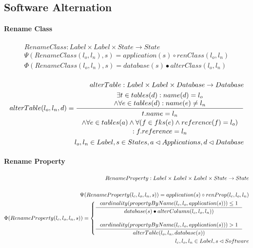 \documentclass[11pt]{article}
\begin{document}
\subsection{Software Alternation}
\paragraph{Rename Class}
\begin{align*}
RenameClass : Label \times Label \times State \rightarrow State \\ 
\Psi(RenameClass(l_o, l_n), s) = application(s) \circ renClass(l_o, l_n) \\
\Phi(RenameClass(l_o, l_n), s) = database(s) \bullet alterClass(l_o, l_n) \\ \\
\end{align*}
\begin{align*}
alterTable:  Label \times Label \times Database \rightarrow Database \\
alterTable(l_o, l_n, d) = \inference{\exists t \in tables(d) : name(d) = l_o \\ \wedge \forall e \in tables(d) : name(e) \neq l_n}{\begin{gathered}
t.name = l_n \\ \wedge \forall e \in tables(a) \wedge \forall (f \in fks(e) \wedge reference(f) = l_o ) \\ : f.reference = l_n 
\end{gathered}}\\
l_o, l_n \in Label, s \in States, a \lhd Applications, d \lhd Database
\end{align*}

\paragraph{Rename Property}
\begin{align*}
	RenameProperty : Label \times Label \times Label \times State \rightarrow State \\ \\
\Psi(RenameProperty(l_c, l_o, l_n, s)) = application(s) \circ renProp(l_c, l_o, l_n) \\
\Phi(RenameProperty(l_c, l_o, l_n, s)) = \begin{cases}
 	\inference{cardinality(propertyByName(l_c, l_o, application(s))) \leq 1}{database(s) \bullet alterColumn(l_c, l_o, l_n))} \\\\
 	\inference{cardinality(propertyByName(l_c, l_o, application(s))) > 1}{alterTable(l_o, l_n, database(s))}
 \end{cases}\\
l_c, l_o, l_n \in Label,  s \lhd Software
\end{align*}
\end{document}
